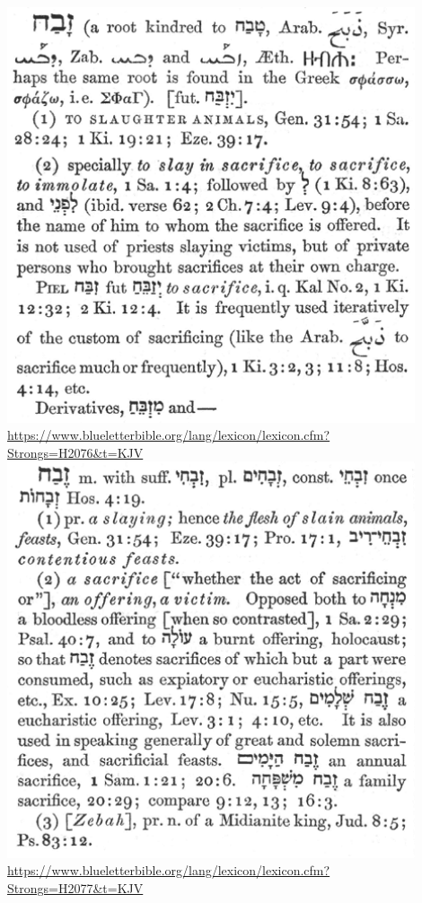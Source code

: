 \documentclass[11pt]{article}
\begin{document}
\begin{thebibliography}{37}
\includegraphics[width=12cm]{slaughter_sacrifice_2076}
\url{https://www.blueletterbible.org/lang/lexicon/lexicon.cfm?Strongs=H2076&t=KJV}
\includegraphics[width=12cm]{slaughter_sacrifice_2077}
\url{https://www.blueletterbible.org/lang/lexicon/lexicon.cfm?Strongs=H2077&t=KJV}


\end{thebibliography}
\end{document}
